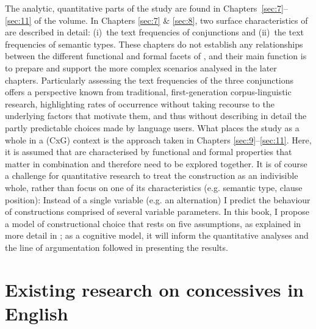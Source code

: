 The analytic, quantitative parts of the study are found in Chapters~\ref{sec:7}–\ref{sec:11} of the volume. In Chapters \ref{sec:7} \& \ref{sec:8}, two surface characteristics of  are described in detail:
(i)~the text frequencies of conjunctions and
(ii)~the text frequencies of semantic types. These chapters do not establish any relationships between the different functional and formal facets of , and their main function is to prepare and support the more complex scenarios analysed in the later chapters. Particularly assessing the text frequencies of the three conjunctions offers a perspective known from traditional, first-generation corpus-linguistic research, highlighting rates of occurrence without taking recourse to the under\-lying factors that motivate them, and thus without describing in detail the partly predictable choices made by language users. What places the study as a whole in a  (CxG) context is the approach taken in Chapters \ref{sec:9}–\ref{sec:11}. Here, it is assumed that  are characterised by functional and formal properties that matter in combination and therefore need to be explored together. It is of course a challenge for quantitative research to treat the construction as an indivisible whole, rather than focus on one of its characteristics (e.g. semantic type, clause position): Instead of a single variable (e.g. an alternation) I predict the behaviour of constructions comprised of several variable parameters. In this book, I propose a model of constructional choice that rests on five assumptions, as explained in more detail in ; as a cognitive model, it will inform the quantitative analyses and the line of argumentation followed in presenting the results.

\section{\label{bkm:Ref51150486}Existing research on concessives in English}\label{sec:1.1}

